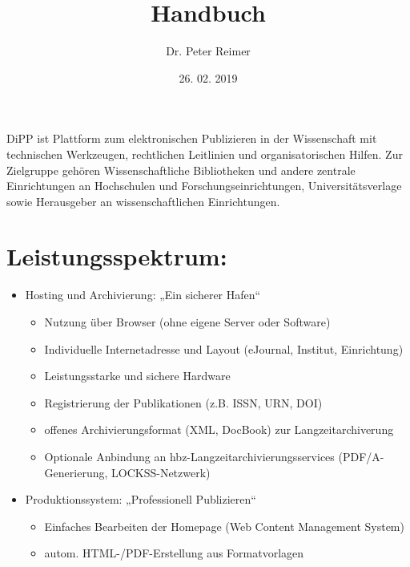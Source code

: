 \documentclass[a4paper,10pt,ngerman]{sphinxmanual}
\title{Handbuch}
\date{26. 02. 2019}
\author{Dr. Peter Reimer}
\begin{document}
\maketitle
\tableofcontents
{}\label{index::doc}


DiPP ist Plattform zum elektronischen Publizieren in der Wissenschaft mit technischen Werkzeugen,
rechtlichen Leitlinien und organisatorischen Hilfen. Zur Zielgruppe gehören Wissenschaftliche Bibliotheken
und andere zentrale Einrichtungen an Hochschulen und Forschungseinrichtungen, Universitätsverlage
sowie Herausgeber an wissenschaftlichen Einrichtungen.


\part{Leistungsspektrum:}
\label{index:digital-peer-publishing-dipp-wissenschaftliche-publikationsplattform}\label{index:leistungsspektrum}\label{index:dokumention-der-produktiven-version}\begin{itemize}
\item {} 
Hosting und Archivierung: „Ein sicherer Hafen“
\begin{itemize}
\item {} 
Nutzung über Browser (ohne eigene Server oder Software)

\item {} 
Individuelle Internetadresse und Layout (eJournal, Institut, Einrichtung)

\item {} 
Leistungsstarke und sichere Hardware

\item {} 
Registrierung der Publikationen (z.B. ISSN, URN, DOI)

\item {} 
offenes Archivierungsformat  (XML, DocBook) zur Langzeitarchiverung

\item {} 
Optionale Anbindung an hbz-Langzeitarchivierungsservices (PDF/A-Generierung, LOCKSS-Netzwerk)

\end{itemize}

\item {} 
Produktionssystem: „Professionell Publizieren“
\begin{itemize}
\item {} 
Einfaches Bearbeiten der Homepage (Web Content Management System)

\item {} 
autom. HTML-/PDF-Erstellung aus Formatvorlagen


\end{itemize}
\end{itemize}
\end{document}
